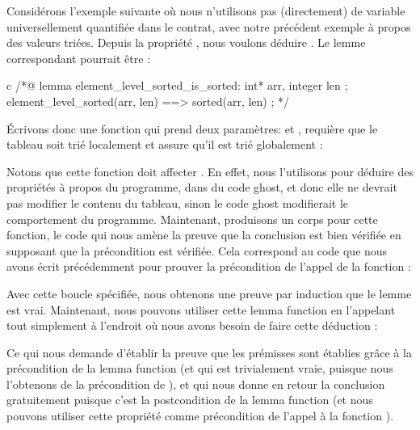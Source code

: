 Considérons l'exemple suivante où nous n'utilisons pas (directement) de
variable universellement quantifiée dans le contrat, avec notre précédent
exemple à propos des valeurs triées. Depuis la propriété
, nous voulons déduire
. Le lemme correspondant pourrait être :


\begin{CodeBlock}{c}
/*@
  lemma element_level_sorted_is_sorted:
    \forall int* arr, integer len ;
       element_level_sorted(arr, len) ==> sorted(arr, len) ;
*/
\end{CodeBlock}


Écrivons donc une fonction qui prend deux paramètres:  et
, requière que le tableau soit trié localement et assure qu'il
est trié globalement :




Notons que cette fonction doit affecter .
En effet, nous l'utilisons pour déduire des propriétés à propos du programme, dans
du code ghost, et donc elle ne devrait pas modifier le contenu du tableau, sinon
le code ghost modifierait le comportement du programme. Maintenant, produisons un
corps pour cette fonction, le code qui nous amène la preuve que la conclusion est
bien vérifiée en supposant que la précondition est vérifiée. Cela correspond au
code que nous avons écrit précédemment pour prouver la précondition de l'appel de
la fonction :





Avec cette boucle spécifiée, nous obtenons une preuve par induction que le lemme
est vrai. Maintenant, nous pouvons utiliser cette lemma function en l'appelant
tout simplement à l'endroit où nous avons besoin de faire cette déduction :




Ce qui nous demande d'établir la preuve que les prémisses sont établies grâce
à la précondition de la lemma function (et qui est trivialement vraie, puisque
nous l'obtenons de la précondition de ), et qui nous
donne en retour la conclusion gratuitement puisque c'est la postcondition de la
lemma function (et nous pouvons utiliser cette propriété comme précondition de
l'appel à la fonction ).


